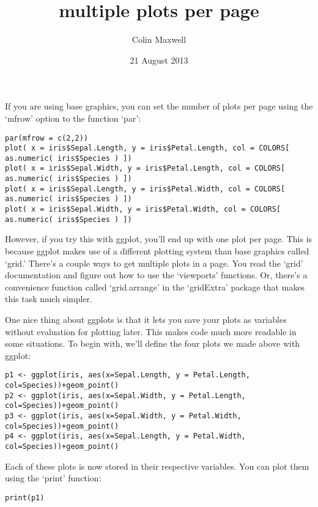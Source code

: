\documentclass[11pt]{article}
\title{multiple plots per page}
\author{Colin Maxwell}
\date{21 August 2013}
\begin{document}
\maketitle

\setcounter{tocdepth}{3}
\tableofcontents
\vspace*{1cm}

If you are using base graphics, you can set the number of plots per
page using the `mfrow' option to the function `par':

\begin{verbatim}
par(mfrow = c(2,2))
plot( x = iris$Sepal.Length, y = iris$Petal.Length, col = COLORS[ as.numeric( iris$Species ) ])
plot( x = iris$Sepal.Width, y = iris$Petal.Length, col = COLORS[ as.numeric( iris$Species ) ])
plot( x = iris$Sepal.Length, y = iris$Petal.Width, col = COLORS[ as.numeric( iris$Species ) ])
plot( x = iris$Sepal.Width, y = iris$Petal.Width, col = COLORS[ as.numeric( iris$Species ) ])
\end{verbatim}


However, if you try this with ggplot, you'll end up with one plot per
page. This is because ggplot makes use of a different plotting system
than base graphics called `grid.' There's a couple ways to get
multiple plots in a page. You read the `grid' documentation and figure
out how to use the `viewports' functions. Or, there's a convenience
function called `grid.arrange' in the `gridExtra' package that makes
this task much simpler.

One nice thing about ggplots is that it lets you save your plots as
variables without evaluation for plotting later. This makes code much
more readable in some situations. To begin with, we'll define the four
plots we made above with ggplot:

\begin{verbatim}
p1 <- ggplot(iris, aes(x=Sepal.Length, y = Petal.Length, col=Species))+geom_point()
p2 <- ggplot(iris, aes(x=Sepal.Width, y = Petal.Length, col=Species))+geom_point()
p3 <- ggplot(iris, aes(x=Sepal.Width, y = Petal.Width, col=Species))+geom_point()
p4 <- ggplot(iris, aes(x=Sepal.Length, y = Petal.Width, col=Species))+geom_point()
\end{verbatim}


Each of these plots is now stored in their respective variables. You
can plot them using the `print' function:

\begin{verbatim}
print(p1)
\end{verbatim}
\end{document}
